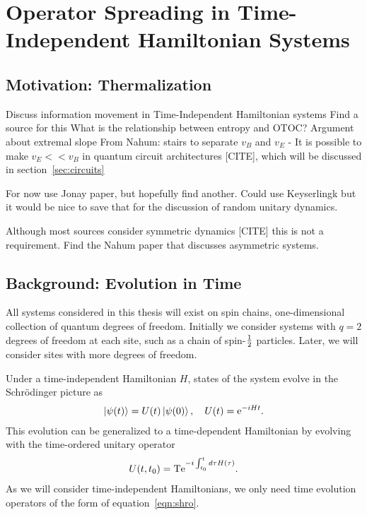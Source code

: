 \section{Operator Spreading in Time-Independent Hamiltonian Systems} \label{sec:opsp}


\subsection{Motivation: Thermalization} \label{sub:therm}

Discuss information movement in Time-Independent Hamiltonian systems
  Find a source for this
  What is the relationship between entropy and OTOC?
  Argument about extremal slope
    From Nahum: stairs to separate $v_B$ and $v_E$ - It is possible to make $v_E << v_B$ in quantum circuit architectures [CITE], which will be discussed in section~\ref{sec:circuits}
    
For now use Jonay paper, but hopefully find another. Could use Keyserlingk but it would be nice to save that for the discussion of random unitary dynamics.

Although most sources consider symmetric dynamics [CITE] this is not a requirement. Find the Nahum paper that discusses asymmetric systems.

\subsection{Background: Evolution in Time} \label{sub:evoltime}

All systems considered in this thesis will exist on spin chains, one-dimensional collection of quantum degrees of freedom. Initially we consider systems with $q=2$ degrees of freedom at each site, such as a chain of spin-$\frac{1}{2}$ particles. Later, we will consider sites with more degrees of freedom. 

Under a time-independent Hamiltonian $H$, states of the system evolve in the Schr\"odinger picture as 
\begin{align}
\left|\psi(t)\right\rangle = U(t)\left|\psi(0)\right\rangle,\quad U(t) = \text{e}^{-iHt}. \label{eqn:shro}
\end{align}
This evolution can be generalized to a time-dependent Hamiltonian by evolving with the time-ordered unitary operator
\begin{align}
U(t,t_0) = \text{T}\text{e}^{-i\int_{t_0}^td\tau H(\tau)}.
\end{align}
As we will consider time-independent Hamiltonians, we only need time evolution operators of the form of equation~\ref{eqn:shro}. 

